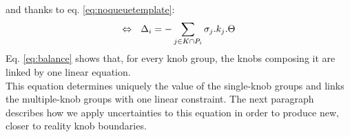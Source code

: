 \\ 
and thanks to eq. \ref{eq:noqueuetemplate}:
\begin{equation}
\centering
\label{eq:balance}
\Leftrightarrow\ \ \Delta_{i}=-\sum\limits_{j\in K\cap P_{i}}\sigma_{j}.k_{j}.\Theta
\end{equation}
Eq. \ref{eq:balance} shows that, for every knob group, the knobs composing it are linked by one linear equation.\\
This equation determines uniquely the value of the single-knob groups and links the multiple-knob groups with one linear constraint. The next paragraph describes how we apply uncertainties to this equation in order to produce new, closer to reality knob boundaries.\\

